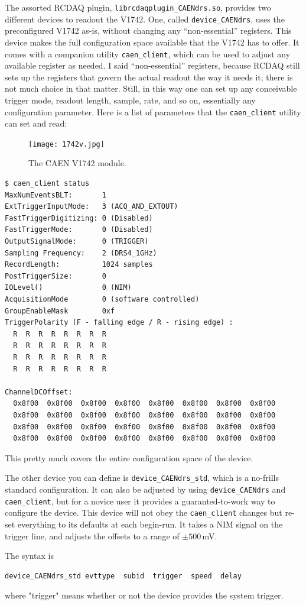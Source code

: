 \documentclass{article}[11pt]
\begin{document}
The assorted RCDAQ plugin, \verb|librcdaqplugin_CAENdrs.so|, provides
two different devices to readout the V1742. One, called
\verb|device_CAENdrs|, uses the preconfigured V1742 as-is, without
changing any ``non-essential'' registers. This device makes the full
configuration space available that the V1742 has to offer. It comes
with a companion utility \verb|caen_client|, which can be used to
adjust any available register as needed. I said ``non-essential''
registers, because RCDAQ still sets up the registers that govern the
actual readout the way it needs it; there is not much choice in that
matter. Still, in this way one can set up any conceivable trigger
mode, readout length, sample, rate, and so on, essentially any
configuration parameter. Here is a list of parameters that the
\verb|caen_client| utility can set and read:

\begin{figure}
  \centering
  \texttt{[image: 1742v.jpg]}
  \caption{\label{caen1742v}The CAEN V1742 module.}
\end{figure}


\begin{verbatim}
$ caen_client status
MaxNumEventsBLT:       1
ExtTriggerInputMode:   3 (ACQ_AND_EXTOUT)
FastTriggerDigitizing: 0 (Disabled)
FastTriggerMode:       0 (Disabled)
OutputSignalMode:      0 (TRIGGER)
Sampling Frequency:    2 (DRS4_1GHz)
RecordLength:          1024 samples
PostTriggerSize:       0
IOLevel()              0 (NIM)
AcquisitionMode        0 (software controlled)
GroupEnableMask        0xf
TriggerPolarity (F - falling edge / R - rising edge) :
  R  R  R  R  R  R  R  R
  R  R  R  R  R  R  R  R
  R  R  R  R  R  R  R  R
  R  R  R  R  R  R  R  R

ChannelDCOffset:
  0x8f00  0x8f00  0x8f00  0x8f00  0x8f00  0x8f00  0x8f00  0x8f00
  0x8f00  0x8f00  0x8f00  0x8f00  0x8f00  0x8f00  0x8f00  0x8f00
  0x8f00  0x8f00  0x8f00  0x8f00  0x8f00  0x8f00  0x8f00  0x8f00
  0x8f00  0x8f00  0x8f00  0x8f00  0x8f00  0x8f00  0x8f00  0x8f00
\end{verbatim}

This pretty much covers the entire configuration space of the device.

The other device you can define is \verb|device_CAENdrs_std|, which is
a no-frills standard configuration. It can also be adjusted by using
\verb|device_CAENdrs| and \verb|caen_client|, but for a novice user it
provides a guaranted-to-work way to configure the device. This device
will not obey the \verb|caen_client| changes but re-set everything to
its defaults at each begin-run. It takes a NIM signal on the
trigger line, and adjusts the offsets to a range of $\pm 500$\,mV.

The syntax is 

\begin{verbatim}
device_CAENdrs_std evttype  subid  trigger  speed  delay
\end{verbatim}

where "trigger" means whether or not the device provides the system trigger. 
\end{document}
